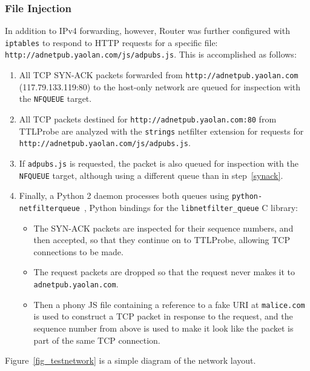 \subsubsection{File Injection}
In addition to IPv4 forwarding, however, Router was further configured with \texttt{iptables} to respond to HTTP requests for a specific file: \texttt{http://adnetpub.yaolan.com/js/adpubs.js}.
This is accomplished as follows:
\begin{enumerate}\addtolength{\itemsep}{-.35\baselineskip}
	\item\label{synack} All TCP SYN-ACK packets forwarded from \texttt{http://adnetpub.yaolan.com} (117.79.133.119:80) to the host-only network are queued for inspection with the \texttt{NFQUEUE} target.
	\item All TCP packets destined for \texttt{http://adnetpub.yaolan.com:80} from TTLProbe are analyzed with the \texttt{strings} netfilter extension for requests for \texttt{http://adnetpub.yaolan.com/js/\allowbreak{}adpubs.js}.
	\item If \texttt{adpubs.js} is requested, the packet is also queued for inspection with the \texttt{NFQUEUE} target, although using a different queue than in step~\ref{synack}.
	\item Finally, a Python 2 daemon processes both queues using \texttt{python-netfilterqueue}~\cite{Kerkhoff2015}, Python bindings for the \texttt{libnetfilter\_queue} C library:
	\begin{itemize}
		\item The SYN-ACK packets are inspected for their sequence numbers, and then accepted, so that they continue on to TTLProbe, allowing TCP connections to be made.
		\item The request packets are dropped so that the request never makes it to \texttt{adnetpub.yaolan.com}.
		\item Then a phony JS file containing a reference to a fake URI at \texttt{malice.com} is used to construct a TCP packet in response to the request, and the sequence number from above is used to make it look like the packet is part of the same TCP connection.
	\end{itemize}
\end{enumerate}
Figure~\ref{fig_testnetwork} is a simple diagram of the network layout.
